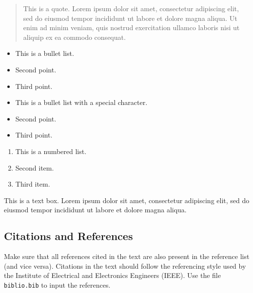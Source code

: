 \documentclass[letterpaper]{EmergentUDB}
\begin{document}
\begin{quote}
This is a quote. Lorem ipsum dolor sit amet, consectetur adipiscing elit, sed do eiusmod tempor incididunt ut labore et dolore magna aliqua. Ut enim ad minim veniam, quis nostrud exercitation ullamco laboris nisi ut aliquip ex ea commodo consequat. 
\end{quote}

\begin{itemize}
\item This is a bullet list.
\item Second point.
\item Third point.
\end{itemize}

\begin{itemize}
\item [\checkmark] This is a bullet list with a special character.
\item [\checkmark] Second point.
\item [\checkmark] Third point.
\end{itemize}

\begin{enumerate}
\item This is a numbered list.
\item Second item.
\item Third item.
\end{enumerate}

\begin{mdframed}[linewidth=1pt]
This is a text box. Lorem ipsum dolor sit amet, consectetur adipiscing elit, sed do eiusmod tempor incididunt ut labore et dolore magna aliqua.
\end{mdframed}


\subsection{Citations and References}
Make sure that all references cited in the text are also present in the reference list (and vice versa). Citations in the text should follow the referencing style used by the Institute of Electrical and Electronics Engineers (IEEE). Use the file \verb|biblio.bib| to input the references.
\end{document}
